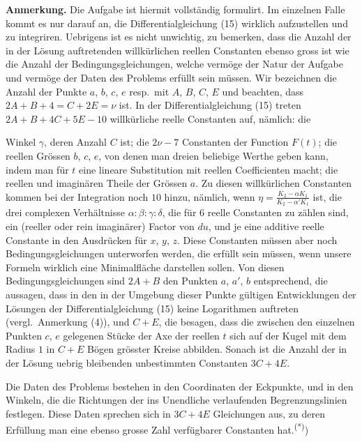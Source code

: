 \documentclass[12pt,a4paper]{article}
\begin{document}
\medskip
\noindent\textbf{Anmerkung.} Die Aufgabe ist hiermit vollst\"andig formulirt. Im einzelnen Falle kommt es nur darauf an, die Differentialgleichung (15) wirklich aufzustellen und zu integriren. Uebrigens ist es nicht unwichtig, zu bemerken, dass die Anzahl der in der L\"osung auftretenden willk\"urlichen reellen Constanten ebenso gross ist wie die Anzahl der Bedingungsgleichungen, welche verm\"oge der Natur der Aufgabe und verm\"oge der Daten des Problems erf\"ullt sein m\"ussen. Wir bezeichnen die Anzahl der Punkte $a$, $b$, $c$, $e$ resp.\ mit $A$, $B$, $C$, $E$ und beachten, dass $2A + B + 4 = C + 2E = \nu$ ist. In der Differentialgleichung (15) treten $2A + B + 4C + 5E - 10$ willk\"urliche reelle Constanten auf, n\"amlich: die

\newpage
\noindent Winkel $\gamma$, deren Anzahl $C$ ist; die $2\nu - 7$ Constanten der Function $F(t)$; die reellen Gr\"ossen $b$, $c$, $e$, von denen man dreien beliebige Werthe geben kann, indem man f\"ur $t$ eine lineare Substitution mit reellen Coefficienten macht; die reellen und imagin\"aren Theile der Gr\"ossen $a$. Zu diesen willk\"urlichen Constanten kommen bei der Integration noch $10$ hinzu, n\"amlich, wenn $\eta = \frac{K_{2} - \alpha K_{1}}{K_{2} - \alpha' K_{1}}$ ist, die drei complexen Verh\"altnisse $\alpha:\beta:\gamma:\delta$, die f\"ur $6$ reelle Constanten zu z\"ahlen sind, ein (reeller oder rein imagin\"arer) Factor von $du$, und je eine additive reelle Constante in den Ausdr\"ucken f\"ur $x$, $y$, $z$. Diese Constanten m\"ussen aber noch Bedingungsgleichungen unterworfen werden, die erf\"ullt sein m\"ussen, wenn unsere Formeln wirklich eine Minimalfl\"ache darstellen sollen. Von diesen Bedingungsgleichungen sind $2A + B$ den Punkten $a$, $a'$, $b$ entsprechend, die aussagen, dass in den in der Umgebung dieser Punkte g\"ultigen Entwicklungen der L\"osungen der Differentialgleichung (15) keine Logarithmen auftreten (vergl.\ Anmerkung (4)), und $C + E$, die besagen, dass die zwischen den einzelnen Punkten $c$, $e$ gelegenen St\"ucke der Axe der reellen $t$ sich auf der Kugel mit dem Radius $1$ in $C + E$ B\"ogen gr\"osster Kreise abbilden. Sonach ist die Anzahl der in der L\"osung uebrig bleibenden unbestimmten Constanten $3C + 4E$.

Die Daten des Problems bestehen in den Coordinaten der Eckpunkte, und in den Winkeln, die die Richtungen der ins Unendliche verlaufenden Begrenzungslinien festlegen. Diese Daten sprechen sich in $3C + 4E$ Gleichungen aus, zu deren Erf\"ullung man eine ebenso grosse Zahl verf\"ugbarer Constanten hat.\textsuperscript{(*)})
\end{document}
